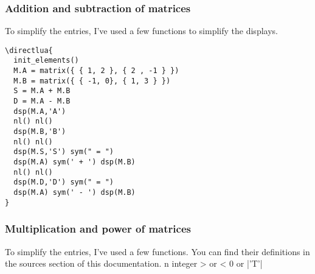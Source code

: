 \subsubsection{Addition and subtraction of matrices} %
\label{ssub:addition_of_matrices}
To simplify the entries, I've used a few functions to simplify the displays.

\vspace{.5em}
\begin{minipage}{.6\textwidth}
\begin{verbatim}
\directlua{
  init_elements()
  M.A = matrix({ { 1, 2 }, { 2 , -1 } })
  M.B = matrix({ { -1, 0}, { 1, 3 } })
  S = M.A + M.B
  D = M.A - M.B
  dsp(M.A,'A')
  nl() nl()
  dsp(M.B,'B')
  nl() nl()
  dsp(M.S,'S') sym(" = ")
  dsp(M.A) sym(' + ') dsp(M.B)
  nl() nl()
  dsp(M.D,'D') sym(" = ")
  dsp(M.A) sym(' - ') dsp(M.B)
}
\end{verbatim}
\end{minipage}
\begin{minipage}{.4\textwidth}
\end{minipage}


\subsubsection{Multiplication and power of matrices} %
\label{ssub:multiplication_of_matrices}
To simplify the entries, I've used a few functions. You can find their definitions in the sources section of this documentation. n integer > or < 0 or |'T'|

